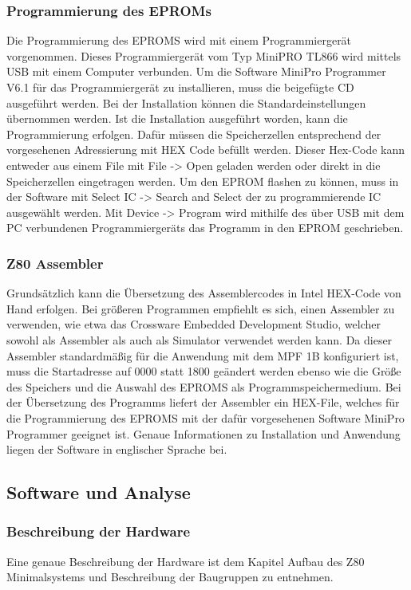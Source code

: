 \subsubsection{Programmierung des EPROMs}
Die Programmierung des EPROMS wird mit einem Programmiergerät vorgenommen. Dieses Programmiergerät vom Typ MiniPRO TL866 wird mittels USB mit einem Computer verbunden. Um die Software MiniPro Programmer V6.1 für das Programmiergerät zu installieren, muss die beigefügte CD ausgeführt werden. Bei der Installation können die Standardeinstellungen übernommen werden. Ist die Installation ausgeführt worden, kann die Programmierung erfolgen. Dafür müssen die Speicherzellen entsprechend der vorgesehenen Adressierung mit HEX Code befüllt werden. Dieser Hex-Code kann entweder aus einem File mit File -> Open geladen werden oder direkt in die Speicherzellen eingetragen werden. Um den EPROM flashen zu können, muss in der Software mit Select IC -> Search and Select der zu programmierende IC ausgewählt werden.  Mit Device -> Program wird mithilfe des über USB mit dem PC verbundenen Programmiergeräts das Programm in den EPROM geschrieben.

\subsubsection{Z80 Assembler}
Grundsätzlich kann die Übersetzung des Assemblercodes in Intel HEX-Code von Hand erfolgen. Bei größeren Programmen empfiehlt es sich, einen Assembler zu verwenden, wie etwa das Crossware Embedded Development Studio, welcher sowohl als Assembler als auch als Simulator verwendet werden kann. Da dieser Assembler standardmäßig für die Anwendung mit dem MPF 1B konfiguriert ist, muss die Startadresse auf 0000 statt 1800 geändert werden ebenso wie die Größe des Speichers und die Auswahl des EPROMS als Programmspeichermedium. Bei der Übersetzung des Programms liefert der Assembler ein HEX-File, welches für die Programmierung des EPROMS mit der dafür vorgesehenen Software MiniPro Programmer geeignet ist. Genaue Informationen zu Installation und Anwendung liegen der Software in englischer Sprache bei.

\subsection{Software und Analyse}
\label{sec:z80-software}
\subsubsection{Beschreibung der Hardware}
Eine genaue Beschreibung der Hardware ist dem Kapitel Aufbau des Z80 Minimalsystems und Beschreibung der Baugruppen zu entnehmen.

